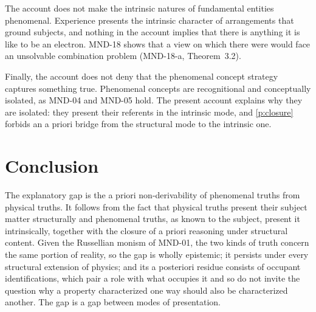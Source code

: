 \documentclass{situationist-preprint}
\begin{document}
The account does not make the intrinsic natures of fundamental entities phenomenal. Experience presents the intrinsic character of arrangements that ground subjects, and nothing in the account implies that there is anything it is like to be an electron. MND-18 shows that a view on which there were would face an unsolvable combination problem (MND-18-a, Theorem~3.2).

Finally, the account does not deny that the phenomenal concept strategy captures something true. Phenomenal concepts are recognitional and conceptually isolated, as MND-04 and MND-05 hold. The present account explains why they are isolated: they present their referents in the intrinsic mode, and \ref{p:closure} forbids an a priori bridge from the structural mode to the intrinsic one.

\section{Conclusion}\label{s:concl}

The explanatory gap is the a priori non-derivability of phenomenal truths from physical truths. It follows from the fact that physical truths present their subject matter structurally and phenomenal truths, as known to the subject, present it intrinsically, together with the closure of a priori reasoning under structural content. Given the Russellian monism of MND-01, the two kinds of truth concern the same portion of reality, so the gap is wholly epistemic; it persists under every structural extension of physics; and its a posteriori residue consists of occupant identifications, which pair a role with what occupies it and so do not invite the question why a property characterized one way should also be characterized another. The gap is a gap between modes of presentation.
\end{document}
